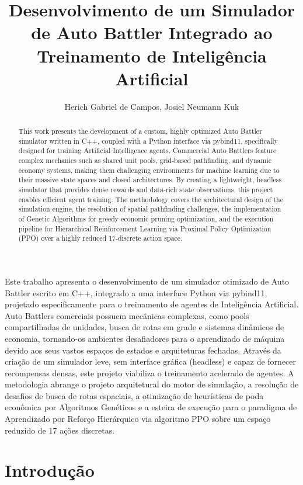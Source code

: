 \documentclass[12pt]{article}
\title{Desenvolvimento de um Simulador de Auto Battler Integrado ao Treinamento de Inteligência Artificial}
\author{Herich Gabriel de Campos\inst{1}, Josiel Neumann Kuk\inst{1}}
\begin{document}
\maketitle

\begin{abstract}
  This work presents the development of a custom, highly optimized Auto Battler simulator written in C++, coupled with a Python interface via pybind11, specifically designed for training Artificial Intelligence agents. Commercial Auto Battlers feature complex mechanics such as shared unit pools, grid-based pathfinding, and dynamic economy systems, making them challenging environments for machine learning due to their massive state spaces and closed architectures. By creating a lightweight, headless simulator that provides dense rewards and data-rich state observations, this project enables efficient agent training. The methodology covers the architectural design of the simulation engine, the resolution of spatial pathfinding challenges, the implementation of Genetic Algorithms for greedy economic pruning optimization, and the execution pipeline for Hierarchical Reinforcement Learning via Proximal Policy Optimization (PPO) over a highly reduced 17-discrete action space.
\end{abstract}

\begin{resumo}
  Este trabalho apresenta o desenvolvimento de um simulador otimizado de Auto Battler escrito em C++, integrado a uma interface Python via pybind11, projetado especificamente para o treinamento de agentes de Inteligência Artificial. Auto Battlers comerciais possuem mecânicas complexas, como pools compartilhadas de unidades, busca de rotas em grade e sistemas dinâmicos de economia, tornando-os ambientes desafiadores para o aprendizado de máquina devido aos seus vastos espaços de estados e arquiteturas fechadas. Através da criação de um simulador leve, sem interface gráfica (headless) e capaz de fornecer recompensas densas, este projeto viabiliza o treinamento acelerado de agentes. A metodologia abrange o projeto arquitetural do motor de simulação, a resolução de desafios de busca de rotas espaciais, a otimização de heurísticas de poda econômica por Algoritmos Genéticos e a esteira de execução para o paradigma de Aprendizado por Reforço Hierárquico via algoritmo PPO sobre um espaço reduzido de 17 ações discretas.
\end{resumo}

\section{Introdução} \label{sec:introducao}
\end{document}
